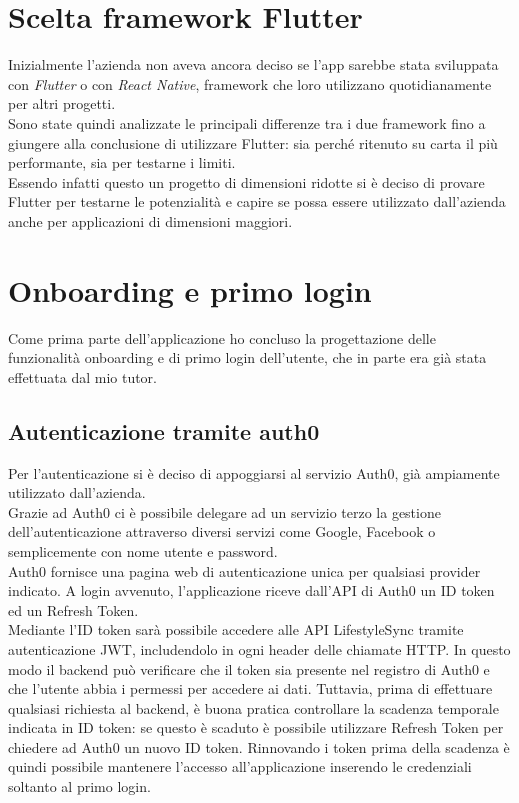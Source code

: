 \section{Scelta framework Flutter}
\label{sec:scelta-framework-flutter}
Inizialmente l'azienda non aveva ancora deciso se l'app sarebbe stata sviluppata con \textit{Flutter} o con \textit{React Native}, framework che loro utilizzano quotidianamente per altri progetti.\\ 
Sono state quindi analizzate le principali differenze tra i due framework fino a giungere alla conclusione di utilizzare Flutter: sia perché ritenuto su carta il più performante, sia per testarne i limiti.\\
Essendo infatti questo un progetto di dimensioni ridotte si è deciso di provare Flutter per testarne le potenzialità e capire se possa essere utilizzato dall'azienda anche per applicazioni di dimensioni maggiori.
\section{Onboarding e primo login}
\label{sec:progettazione-onboarding-primo-login}
Come prima parte dell'applicazione ho concluso la progettazione delle funzionalità onboarding e di primo login dell'utente, che in parte era già stata effettuata dal mio tutor.
\subsection{Autenticazione tramite auth0}
\label{sec:autenticazione-tramite-auth0}
Per l'autenticazione si è deciso di appoggiarsi al servizio Auth0, già ampiamente utilizzato dall'azienda.\\
Grazie ad Auth0 ci è possibile delegare ad un servizio terzo la gestione dell'autenticazione attraverso diversi servizi come Google, Facebook o semplicemente con nome utente e password.\\
Auth0 fornisce una pagina web di autenticazione unica per qualsiasi provider indicato. A login avvenuto, l’applicazione riceve dall’API di Auth0 un ID token ed un Refresh Token.\\ Mediante l’ID token sarà possibile accedere alle API LifestyleSync tramite autenticazione \gls{JWT}, includendolo in ogni header delle chiamate HTTP. In questo modo il backend può verificare che il token sia presente nel registro di Auth0 e che l’utente abbia i permessi per accedere ai dati. Tuttavia, prima di effettuare qualsiasi richiesta al backend, è buona pratica controllare la scadenza temporale indicata in ID token: se questo è scaduto è possibile utilizzare Refresh Token per chiedere ad Auth0 un nuovo ID token. Rinnovando i token prima della scadenza è quindi possibile mantenere l’accesso all’applicazione inserendo le credenziali soltanto al primo login.

